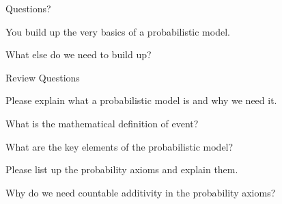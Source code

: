 \begin{frame}{}
\vspace{2cm}
\LARGE Questions?




\end{frame}

\begin{frame}{}
\vspace{2cm}


\medskip
\LARGE You build up the very basics of a probabilistic model. 

\medskip

\LARGE What else do we need to build up?
\end{frame}

\begin{frame}{Review Questions}
\bce[1)]
\item Please explain what a probabilistic model is and why we need it. 

\item What is the mathematical definition of event?

\item What are the key elements of the probabilistic model?

\item Please list up the probability axioms and explain them. 

\item Why do we need countable additivity in the probability axioms?

\ece
\end{frame}




